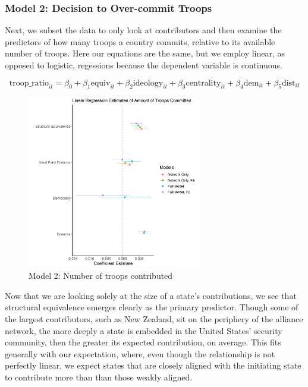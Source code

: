 \documentclass[12pt,letterpaper]{article}
\begin{document}
		\subsubsection{Model 2: Decision to Over-commit Troops}
			Next, we subset the data to only look at contributors and then examine the predictors of how many troops a country commits, relative to its available number of troops. Here our equations are the same, but we employ linear, as opposed to logistic, regessions because the dependent variable is continuous.

			\vspace{-2em}
			\begin{equation*}
				\text{troop\_ratio}_{it} = \beta_0 + \beta_1\text{equiv}_{it} + \beta_2\text{ideology}_{it} + \beta_3\text{centrality}_{it} + \beta_4\text{dem}_{it} + \beta_5\text{dist}_{it}
			\end{equation*}

			\begin{figure}[H]
			\centering
				\includegraphics[width=0.675\textwidth]{linear_coef.png}
			\caption{Model 2: Number of troops contributed}
			\label{fig:linear_reg}
			\end{figure}

		Now that we are looking solely at the size of a state's contributions, we see that structural equivalence emerges clearly as the primary predictor. Though some of the largest contributors, such as New Zealand, sit on the periphery of the alliance network, the more deeply a state is embedded in the United States' security community, then the greater its expected contribution, on average. This fits generally with our expectation, where, even though the relationship is not perfectly linear, we expect states that are closely aligned with the initiating state to contribute more than than those weakly aligned.
\end{document}
